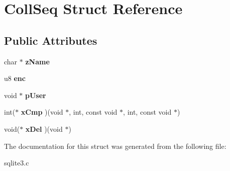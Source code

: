 \hypertarget{structCollSeq}{}\section{Coll\+Seq Struct Reference}
\label{structCollSeq}
\subsection*{Public Attributes}
\begin{DoxyCompactItemize}
\item 
char $\ast$ {\bfseries z\+Name}\hypertarget{structCollSeq_a48d6d5f71d4f8a3ab122903464e8b4a1}{}\label{structCollSeq_a48d6d5f71d4f8a3ab122903464e8b4a1}

\item 
u8 {\bfseries enc}\hypertarget{structCollSeq_add27da1a70ed6f538447e9183eeb4838}{}\label{structCollSeq_add27da1a70ed6f538447e9183eeb4838}

\item 
void $\ast$ {\bfseries p\+User}\hypertarget{structCollSeq_a3cee924d41e730ccec7f686eb5b6f041}{}\label{structCollSeq_a3cee924d41e730ccec7f686eb5b6f041}

\item 
int($\ast$ {\bfseries x\+Cmp} )(void $\ast$, int, const void $\ast$, int, const void $\ast$)\hypertarget{structCollSeq_a3f5a0c7eb4da9d8e396138719210f580}{}\label{structCollSeq_a3f5a0c7eb4da9d8e396138719210f580}

\item 
void($\ast$ {\bfseries x\+Del} )(void $\ast$)\hypertarget{structCollSeq_a92c8da8b4021953e5bdc0fd9af077f1f}{}\label{structCollSeq_a92c8da8b4021953e5bdc0fd9af077f1f}

\end{DoxyCompactItemize}


The documentation for this struct was generated from the following file\+:\begin{DoxyCompactItemize}
\item 
sqlite3.\+c\end{DoxyCompactItemize}
